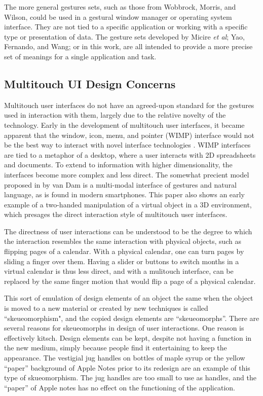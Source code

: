 The more general gestures sets, such as those from Wobbrock, Morris, and Wilson, could be used in a gestural window manager or operating system interface. 
They are not tied to a specific application or working with a specific type or presentation of data.
The gesture sets developed by Micire \textit{et al}; Yao, Fernando, and Wang; or in this work, are all intended to provide a more precise set of meanings for a single application and task. 


\subsection{Multitouch UI Design Concerns} \label{section:Multitouch_UI_Design_Concerns}
Multitouch user interfaces do not have an agreed-upon standard for the gestures used in interaction with them, largely due to the relative novelty of the technology. 
Early in the development of multitouch user interfaces, it became apparent that the window, icon, menu, and pointer (WIMP) interface would not be the best way to interact with novel interface technologies \citep{van1997post}. 
WIMP interfaces are tied to a metaphor of a desktop, where a user interacts with 2D spreadsheets and documents. 
To extend to information with higher dimensionality, the interfaces become more complex and less direct. 
The somewhat precient model proposed in by van Dam is a multi-modal interface of gestures and natural language, as is found in modern smartphones. 
This paper also shows an early example of a two-handed manipulation of a virtual object in a 3D environment, which presages the direct interaction style of multitouch user interfaces. 

The directness of user interactions can be understood to be the degree to which the interaction resembles the same interaction with physical objects, such as flipping pages of a calendar. 
With a physical calendar, one can turn pages by sliding a finger over them. 
Having a slider or buttons to switch months in a virtual calendar is thus less direct, and with a mulitouch interface, can be replaced by the same finger motion that would flip a page of a physical calendar.

This sort of emulation of design elements of an object the same when the object is moved to a new material or created by new techniques is called ``skeueomorphism", and the copied design elements are ``skeueomorphs''. 
There are several reasons for skeueomorphs in design of user interactions. 
One reason is effectively kitsch. 
Design elements can be kept, despite not having a function in the new medium, simply because people find it entertaining to keep the appearance.
The vestigial jug handles on bottles of maple syrup or the yellow ``paper'' background of Apple Notes prior to its redesign are an example of this type of skueomorphism.
The jug handles are too small to use as handles, and the ``paper'' of Apple notes has no effect on the functioning of the application. 

